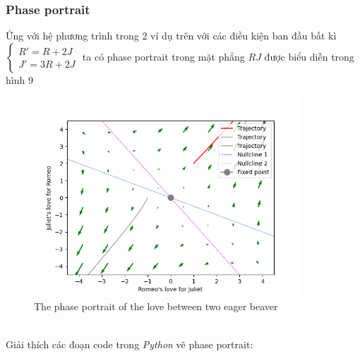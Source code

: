 \subsubsection{Phase portrait}
Ứng với hệ phương trình trong 2 ví dụ trên với các điều kiện ban đầu bất kì
$\begin{cases}
        R'=R+2J\\
        J'=3R+2J
\end{cases}$
ta có phase portrait trong mặt phẳng $RJ$ được biểu diễn trong hình 9
\begin{figure}[h!]
    \begin{center}
    \includegraphics[width=10cm]{images/phase_portrait_eager_beaver.png}
    \end{center}
    \caption{The phase portrait of the love between two eager beaver}
\end{figure}\\
Giải thích các đoạn code trong \textit{Python} vẽ phase portrait:
